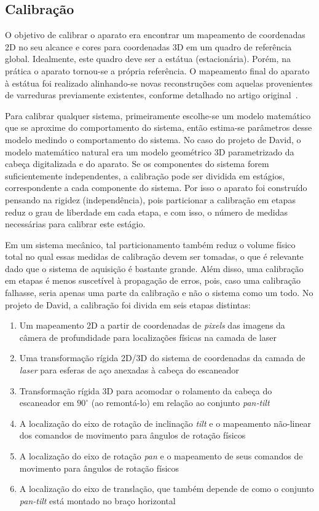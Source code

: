 \subsection*{Calibração}

O objetivo de calibrar o aparato era encontrar um mapeamento de coordenadas 2D
no seu alcance e cores para coordenadas 3D em um quadro de referência global.
Idealmente, este quadro deve ser a estátua (estacionária). Porém, 
na prática o aparato tornou-se a própria referência. O mapeamento final do aparato à estátua
foi realizado alinhando-se novas reconstruções com aquelas provenientes de varreduras previamente 
existentes, conforme detalhado no artigo original~\cite{levoy2000digital}.

Para calibrar qualquer sistema, primeiramente escolhe-se um modelo matemático
que se aproxime do comportamento do sistema, então estima-se parâmetros desse
modelo medindo o comportamento do sistema. No caso do projeto de David, o
modelo matemático natural era um modelo geométrico 3D parametrizado da cabeça
digitalizada e do aparato. Se os componentes do sistema forem suficientemente
independentes, a calibração pode ser dividida em estágios, correspondente a
cada componente do sistema. Por isso o aparato foi construído pensando na
rigidez (independência), pois particionar a calibração em etapas reduz o grau
de liberdade em cada etapa, e com isso, o número de medidas necessárias para
calibrar este estágio.

Em um sistema mecânico, tal particionamento também reduz o volume físico total no qual essas
medidas de calibração devem ser tomadas, o que é relevante dado que o sistema
de aquisição é bastante grande. Além disso, uma calibração em etapas é menos
suscetível à propagação de erros, pois, caso uma calibração falhasse, seria
apenas uma parte da calibração e não o sistema como um todo. No projeto de
David, a calibração foi divida em seis etapas distintas:

\begin{enumerate}
\item{Um mapeamento 2D a partir de coordenadas de \emph{pixels} das imagens da
  câmera de profundidade para localizações físicas na camada de laser}
\item{Uma transformação rígida 2D/3D do sistema de coordenadas da camada de
    \emph{laser} para esferas de aço anexadas à cabeça do escaneador}
\item{Transformação rígida 3D para acomodar o rolamento da cabeça do escaneador 
    em $90^{\circ}$ (ao remontá-lo) em relação ao conjunto \emph{pan-tilt}}
  \item{A localização do eixo de rotação de inclinação \emph{tilt} e o mapeamento não-linear
  dos comandos de movimento para ângulos de rotação físicos}
\item{A localização do eixo de rotação \emph{pan} e o mapeamento de seus
  comandos de movimento para ângulos de rotação físicos}
\item{A localização do eixo de translação, que também depende de como o
    conjunto \emph{pan-tilt} está montado no braço horizontal}
\end{enumerate}

